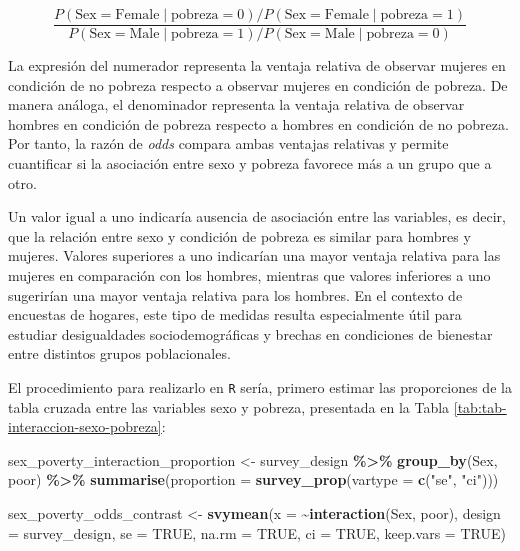\documentclass[
  spanish,
  12pt,
]{book}
\newenvironment{Shaded}{\begin{snugshade}}{\end{snugshade}}
\newcommand{\AttributeTok}[1]{\textcolor[rgb]{0.13,0.29,0.53}{#1}}
\newcommand{\ConstantTok}[1]{\textcolor[rgb]{0.56,0.35,0.01}{#1}}
\newcommand{\FunctionTok}[1]{\textcolor[rgb]{0.13,0.29,0.53}{\textbf{#1}}}
\newcommand{\NormalTok}[1]{#1}
\newcommand{\OtherTok}[1]{\textcolor[rgb]{0.56,0.35,0.01}{#1}}
\newcommand{\SpecialCharTok}[1]{\textcolor[rgb]{0.81,0.36,0.00}{\textbf{#1}}}
\newcommand{\StringTok}[1]{\textcolor[rgb]{0.31,0.60,0.02}{#1}}
\begin{document}
\[
\frac{
P(\text{Sex}=\text{Female} \mid \text{pobreza}=0)
\big/
P(\text{Sex}=\text{Female} \mid \text{pobreza}=1)
}{
P(\text{Sex}=\text{Male} \mid \text{pobreza}=1)
\big/
P(\text{Sex}=\text{Male} \mid \text{pobreza}=0)
}
\]

La expresión del numerador representa la ventaja relativa de observar mujeres en condición de no pobreza respecto a observar mujeres en condición de pobreza. De manera análoga, el denominador representa la ventaja relativa de observar hombres en condición de pobreza respecto a hombres en condición de no pobreza. Por tanto, la razón de \emph{odds} compara ambas ventajas relativas y permite cuantificar si la asociación entre sexo y pobreza favorece más a un grupo que a otro.

Un valor igual a uno indicaría ausencia de asociación entre las variables, es decir, que la relación entre sexo y condición de pobreza es similar para hombres y mujeres. Valores superiores a uno indicarían una mayor ventaja relativa para las mujeres en comparación con los hombres, mientras que valores inferiores a uno sugerirían una mayor ventaja relativa para los hombres. En el contexto de encuestas de hogares, este tipo de medidas resulta especialmente útil para estudiar desigualdades sociodemográficas y brechas en condiciones de bienestar entre distintos grupos poblacionales.

El procedimiento para realizarlo en \texttt{R} sería, primero estimar las proporciones de la tabla cruzada entre las variables sexo y pobreza, presentada en la Tabla \ref{tab:tab-interaccion-sexo-pobreza}:

\begin{Shaded}
\begin{Highlighting}[]
\NormalTok{sex\_poverty\_interaction\_proportion }\OtherTok{\textless{}{-}}\NormalTok{ survey\_design }\SpecialCharTok{\%\textgreater{}\%}
  \FunctionTok{group\_by}\NormalTok{(Sex, poor) }\SpecialCharTok{\%\textgreater{}\%}
  \FunctionTok{summarise}\NormalTok{(}\AttributeTok{proportion =} \FunctionTok{survey\_prop}\NormalTok{(}\AttributeTok{vartype =} \FunctionTok{c}\NormalTok{(}\StringTok{"se"}\NormalTok{, }\StringTok{"ci"}\NormalTok{)))}

\NormalTok{sex\_poverty\_odds\_contrast }\OtherTok{\textless{}{-}} \FunctionTok{svymean}\NormalTok{(}\AttributeTok{x =} \SpecialCharTok{\textasciitilde{}}\FunctionTok{interaction}\NormalTok{(Sex, poor),}
                                     \AttributeTok{design =}\NormalTok{ survey\_design,}
                                     \AttributeTok{se =} \ConstantTok{TRUE}\NormalTok{, }\AttributeTok{na.rm =} \ConstantTok{TRUE}\NormalTok{, }\AttributeTok{ci =} \ConstantTok{TRUE}\NormalTok{,}
                                     \AttributeTok{keep.vars =} \ConstantTok{TRUE}\NormalTok{)}
\end{Highlighting}
\end{Shaded}
\end{document}
